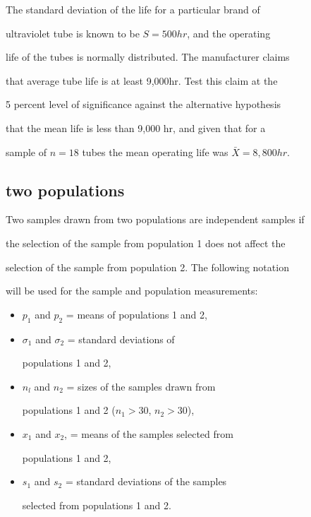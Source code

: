 The standard deviation of the life for a particular brand of

ultraviolet tube is known to be $S = 500 hr$, and the operating

life of the tubes is normally distributed. The manufacturer claims

that average tube life is at least 9,000hr. Test this claim at the

5 percent level of significance against the alternative hypothesis

that the mean life is less than 9,000 hr, and given that for a

sample of $n = 18$ tubes the mean operating life was $\bar{X}=

8,800 hr.$

 



\subsection{two populations}

 

Two samples drawn from two populations are independent samples if

the selection of the sample from population 1 does not affect the

selection of the sample from population 2. The following notation

will be used for the sample and population measurements:

 

\begin{itemize}

\item $p_1$ and $p_2$ = means of populations 1 and 2,

 

\item $\sigma_1$ and $\sigma_2$ = standard deviations of

populations 1 and 2,

 

\item $n_l$ and $n_2$ = sizes of the samples drawn from

populations 1 and 2 ($n_1 >30 $, $n_2 >30 $),

 

\item $x_1$ and $x_2$, = means of the samples selected from

populations 1 and 2,

 

\item $s_{1}$ and $s_{2}$ = standard deviations of the samples

selected from populations 1 and 2.

 

\end{itemize}

